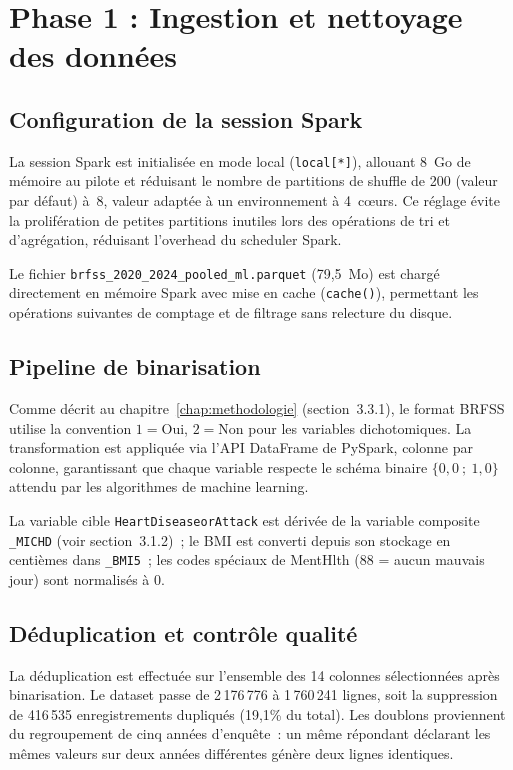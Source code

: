 \section{Phase 1 : Ingestion et nettoyage des données}

\subsection{Configuration de la session Spark}

La session Spark est initialisée en mode local (\texttt{local[*]}), allouant 8~Go
de mémoire au pilote et réduisant le nombre de partitions de shuffle de 200
(valeur par défaut) à~8, valeur adaptée à un environnement à 4~cœurs. Ce réglage
évite la prolifération de petites partitions inutiles lors des opérations de tri et
d'agrégation, réduisant l'overhead du scheduler Spark.

Le fichier \texttt{brfss\_2020\_2024\_pooled\_ml.parquet} (79,5~Mo) est chargé
directement en mémoire Spark avec mise en cache (\texttt{cache()}), permettant les
opérations suivantes de comptage et de filtrage sans relecture du disque.

\subsection{Pipeline de binarisation}

Comme décrit au chapitre~\ref{chap:methodologie} (section~3.3.1), le format BRFSS
utilise la convention $1 = \text{Oui}$, $2 = \text{Non}$ pour les variables
dichotomiques. La transformation est appliquée via l'API DataFrame de PySpark,
colonne par colonne, garantissant que chaque variable respecte le schéma binaire
$\{0{,}0~;~1{,}0\}$ attendu par les algorithmes de machine learning.

La variable cible \texttt{HeartDiseaseorAttack} est dérivée de la variable composite
\texttt{\_MICHD} (voir section~3.1.2)~; le BMI est converti depuis son stockage
en centièmes dans \texttt{\_BMI5}~; les codes spéciaux de MentHlth (88 = aucun
mauvais jour) sont normalisés à 0.

\subsection{Déduplication et contrôle qualité}

La déduplication est effectuée sur l'ensemble des 14 colonnes sélectionnées après
binarisation. Le dataset passe de 2\,176\,776 à 1\,760\,241 lignes, soit la
suppression de 416\,535 enregistrements dupliqués (19,1\% du total). Les doublons
proviennent du regroupement de cinq années d'enquête~: un même répondant déclarant
les mêmes valeurs sur deux années différentes génère deux lignes identiques.

